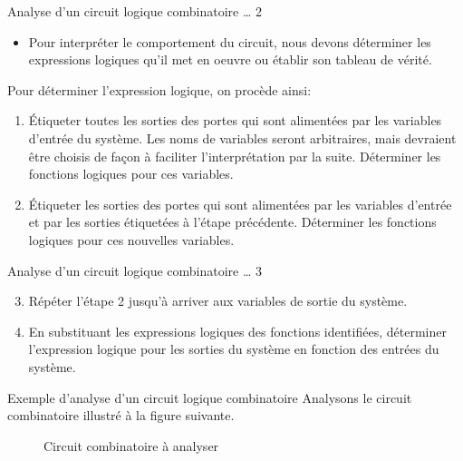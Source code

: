 \documentclass[presentation]{beamer}
\begin{document}
\begin{frame}[label={sec:org205a2b4}]{Analyse d'un circuit logique combinatoire \ldots{} 2}
\begin{itemize}
\item Pour interpréter le comportement du circuit, nous devons déterminer les expressions logiques qu'il met en oeuvre ou établir son tableau de vérité.
\end{itemize}


Pour déterminer l'expression logique, on procède ainsi:
\begin{enumerate}
\item Étiqueter toutes les sorties des portes qui sont alimentées par les
variables d'entrée du système. Les noms de variables seront
arbitraires, mais devraient être choisis de façon à faciliter
l'interprétation par la suite. Déterminer les fonctions logiques
pour ces variables.
\item Étiqueter les sorties des portes qui sont alimentées par les
variables d'entrée et par les sorties étiquetées à l'étape
précédente. Déterminer les fonctions logiques pour ces nouvelles
variables.
\end{enumerate}
\end{frame}

\begin{frame}[label={sec:orgf4d455f}]{Analyse d'un circuit logique combinatoire \ldots{} 3}
\begin{enumerate}
\setcounter{enumi}{2}
\item Répéter l'étape 2 jusqu'à arriver aux variables de sortie du système.
\item En substituant les expressions logiques des fonctions identifiées,
déterminer l'expression logique pour les sorties du système en
fonction des entrées du système.
\end{enumerate}
\end{frame}

\begin{frame}[label={sec:org6b59d92}]{Exemple d'analyse d'un circuit logique combinatoire}
Analysons le circuit combinatoire illustré à la figure
suivante.

\begin{figure}[htbp]
\centering

\caption{\label{fig:org0575236}Circuit combinatoire à analyser}
\end{figure}
\end{frame}
\end{document}
